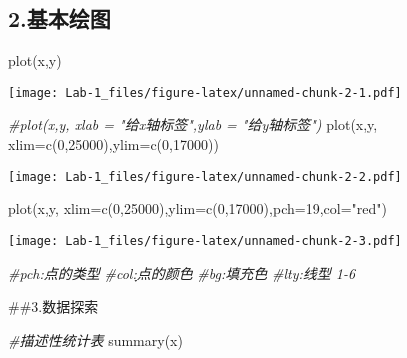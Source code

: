 \documentclass[
]{article}
\newenvironment{Shaded}{\begin{snugshade}}{\end{snugshade}}
\newcommand{\AttributeTok}[1]{\textcolor[rgb]{0.77,0.63,0.00}{#1}}
\newcommand{\CommentTok}[1]{\textcolor[rgb]{0.56,0.35,0.01}{\textit{#1}}}
\newcommand{\DecValTok}[1]{\textcolor[rgb]{0.00,0.00,0.81}{#1}}
\newcommand{\FunctionTok}[1]{\textcolor[rgb]{0.00,0.00,0.00}{#1}}
\newcommand{\NormalTok}[1]{#1}
\newcommand{\StringTok}[1]{\textcolor[rgb]{0.31,0.60,0.02}{#1}}
\begin{document}
\hypertarget{ux57faux672cux7ed8ux56fe}{%
\subsection{2.基本绘图}\label{ux57faux672cux7ed8ux56fe}}

\begin{Shaded}
\begin{Highlighting}[]
\FunctionTok{plot}\NormalTok{(x,y)}
\end{Highlighting}
\end{Shaded}

\texttt{[image: Lab-1\_files/figure-latex/unnamed-chunk-2-1.pdf]}

\begin{Shaded}
\begin{Highlighting}[]
\CommentTok{\#plot(x,y, xlab = "给x轴标签",ylab = "给y轴标签")}
\FunctionTok{plot}\NormalTok{(x,y, }\AttributeTok{xlim=}\FunctionTok{c}\NormalTok{(}\DecValTok{0}\NormalTok{,}\DecValTok{25000}\NormalTok{),}\AttributeTok{ylim=}\FunctionTok{c}\NormalTok{(}\DecValTok{0}\NormalTok{,}\DecValTok{17000}\NormalTok{))}
\end{Highlighting}
\end{Shaded}

\texttt{[image: Lab-1\_files/figure-latex/unnamed-chunk-2-2.pdf]}

\begin{Shaded}
\begin{Highlighting}[]
\FunctionTok{plot}\NormalTok{(x,y, }\AttributeTok{xlim=}\FunctionTok{c}\NormalTok{(}\DecValTok{0}\NormalTok{,}\DecValTok{25000}\NormalTok{),}\AttributeTok{ylim=}\FunctionTok{c}\NormalTok{(}\DecValTok{0}\NormalTok{,}\DecValTok{17000}\NormalTok{),}\AttributeTok{pch=}\DecValTok{19}\NormalTok{,}\AttributeTok{col=}\StringTok{"red"}\NormalTok{) }
\end{Highlighting}
\end{Shaded}

\texttt{[image: Lab-1\_files/figure-latex/unnamed-chunk-2-3.pdf]}

\begin{Shaded}
\begin{Highlighting}[]
\CommentTok{\#pch:点的类型}
\CommentTok{\#col:ָ点的颜色}
\CommentTok{\#bg:填充色}
\CommentTok{\#lty:线型 1{-}6}
\end{Highlighting}
\end{Shaded}

\#\#3.数据探索

\begin{Shaded}
\begin{Highlighting}[]
\CommentTok{\#描述性统计表}
\FunctionTok{summary}\NormalTok{(x)}
\end{Highlighting}
\end{Shaded}
\end{document}
